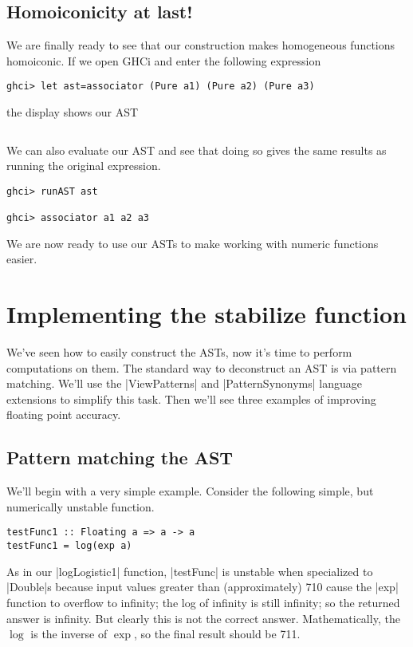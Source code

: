 \documentclass[preprint]{sigplanconf}
\theoremstyle{definition}
\begin{document}
\subsection{Homoiconicity at last!}
We are finally ready to see that our construction makes homogeneous functions homoiconic.
If we open GHCi and enter the following expression
\begin{lstlisting}
ghci> let ast=associator (Pure a1) (Pure a2) (Pure a3)
\end{lstlisting}
the display shows our AST
\begin{lstlisting}
\end{lstlisting}
We can also evaluate our AST and see that doing so gives the same results as running the original expression.
\begin{lstlisting}
ghci> runAST ast

ghci> associator a1 a2 a3

\end{lstlisting}
We are now ready to use our ASTs to make working with numeric functions easier.

\section{Implementing the stabilize function}
\label{sec:stabilize}

We've seen how to easily construct the ASTs,
now it's time to perform computations on them.
The standard way to deconstruct an AST is via pattern matching.
We'll use the |ViewPatterns| and |PatternSynonyms| language extensions to simplify this task.
Then we'll see three examples of improving floating point accuracy.

\subsection{Pattern matching the AST}

We'll begin with a very simple example.
Consider the following simple, but numerically unstable function.
\begin{lstlisting}
testFunc1 :: Floating a => a -> a
testFunc1 = log(exp a)
\end{lstlisting}
As in our |logLogistic1| function, |testFunc| is unstable when specialized to |Double|s
because input values greater than (approximately) 710 cause the |exp| function to overflow to infinity;
the log of infinity is still infinity;
so the returned answer is infinity.
But clearly this is not the correct answer.
Mathematically, the $\log$ is the inverse of $\exp$, so the final result should be 711.
\end{document}
